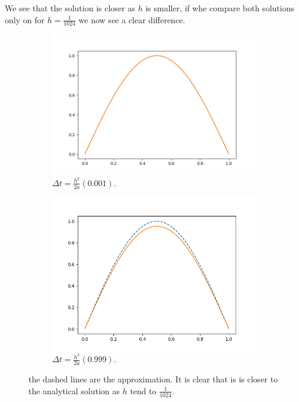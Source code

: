 \documentclass{article}
\begin{document}
We see that the solution is closer as $h$ is smaller, if whe compare both solutions only on for $h = \frac{1}{1024}$ we now see a clear difference.
\begin{figure}[h!]
	\centering
	\begin{subfigure}[b]{0.4\linewidth}
		\includegraphics[width=\linewidth]{5.png}
		\caption{$\Delta t = \frac{h^2}{2a}(0.001)$.}
	\end{subfigure}
	\begin{subfigure}[b]{0.4\linewidth}
		\includegraphics[width=\linewidth]{3.png}
		\caption{$\Delta t = \frac{h^2}{2a} (0.999)$.}
	\end{subfigure}
	\caption{the dashed lines are the approximation. It is clear that is is closer to the analytical solution as $h$ tend to $\frac{1}{1024}$.}
	\label{fig:cmp2}
\end{figure}
\end{document}
